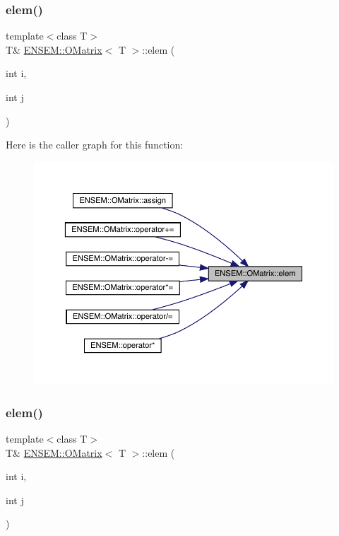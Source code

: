 \subsubsection{\texorpdfstring{elem()}{elem()}\hspace{0.1cm}{\footnotesize\ttfamily [1/4]}}
{\footnotesize\ttfamily template$<$class T$>$ \\
T\& \mbox{\hyperlink{classENSEM_1_1OMatrix}{E\+N\+S\+E\+M\+::\+O\+Matrix}}$<$ T $>$\+::elem (\begin{DoxyParamCaption}\item[{int}]{i,  }\item[{int}]{j }\end{DoxyParamCaption})\hspace{0.3cm}{\ttfamily [inline]}}

Here is the caller graph for this function\+:\nopagebreak
\begin{figure}[H]
\begin{center}
\leavevmode
\includegraphics[width=350pt]{dd/d80/classENSEM_1_1OMatrix_a0a15388ff6dc8159664f6dc14a35b399_icgraph}
\end{center}
\end{figure}
\mbox{\label{classENSEM_1_1OMatrix_a0a15388ff6dc8159664f6dc14a35b399}} 
\subsubsection{\texorpdfstring{elem()}{elem()}\hspace{0.1cm}{\footnotesize\ttfamily [2/4]}}
{\footnotesize\ttfamily template$<$class T$>$ \\
T\& \mbox{\hyperlink{classENSEM_1_1OMatrix}{E\+N\+S\+E\+M\+::\+O\+Matrix}}$<$ T $>$\+::elem (\begin{DoxyParamCaption}\item[{int}]{i,  }\item[{int}]{j }\end{DoxyParamCaption})\hspace{0.3cm}{\ttfamily [inline]}}

